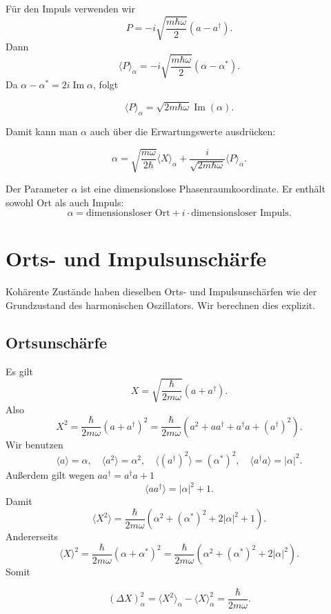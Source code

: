 Für den Impuls verwenden wir
\[
    P=-i\sqrt{\frac{m\hbar\omega}{2}}(a-a^\dagger).
\]
Dann
\[
    \langle P\rangle_\alpha
    =-i\sqrt{\frac{m\hbar\omega}{2}}(\alpha-
    \alpha^*).
\]
Da \(\alpha-
\alpha^*=2i\operatorname{Im}\alpha\), folgt
\begin{formulabox}
\[
    \langle P\rangle_\alpha
    =\sqrt{2m\hbar\omega}\operatorname{Im}(\alpha).
\]
\end{formulabox}

Damit kann man \(\alpha\) auch über die Erwartungswerte ausdrücken:
\begin{formulabox}
\[
    \alpha
    =\sqrt{\frac{m\omega}{2\hbar}}\langle X\rangle_
    \alpha
    +\frac{i}{\sqrt{2m\hbar\omega}}\langle P\rangle_
    \alpha.
\]
\end{formulabox}

\begin{conceptbox}
Der Parameter \(\alpha\) ist eine dimensionslose Phasenraumkoordinate. Er enthält sowohl Ort als auch Impuls:
\[
    \alpha = \text{dimensionsloser Ort}+i\cdot\text{dimensionsloser Impuls}.
\]
\end{conceptbox}

\section{Orts- und Impulsunschärfe}

Kohärente Zustände haben dieselben Orts- und Impulsunschärfen wie der Grundzustand des harmonischen Oszillators. Wir berechnen dies explizit.

\subsection{Ortsunschärfe}

Es gilt
\[
    X=\sqrt{\frac{\hbar}{2m\omega}}(a+a^\dagger).
\]
Also
\[
    X^2=\frac{\hbar}{2m\omega}(a+a^\dagger)^2
    =\frac{\hbar}{2m\omega}\left(a^2+aa^\dagger+a^\dagger a+(a^\dagger)^2\right).
\]
Wir benutzen
\[
    \langle a\rangle=\alpha,
    \quad
    \langle a^2\rangle=\alpha^2,
    \quad
    \langle (a^\dagger)^2\rangle=(\alpha^*)^2,
    \quad
    \langle a^\dagger a\rangle=|\alpha|^2.
\]
Außerdem gilt wegen \(aa^\dagger=a^\dagger a+1\)
\[
    \langle aa^\dagger\rangle=|\alpha|^2+1.
\]
Damit
\[
    \langle X^2\rangle
    =\frac{\hbar}{2m\omega}\left(\alpha^2+(\alpha^*)^2+2|\alpha|^2+1\right).
\]
Andererseits
\[
    \langle X\rangle^2
    =\frac{\hbar}{2m\omega}(\alpha+\alpha^*)^2
    =\frac{\hbar}{2m\omega}\left(\alpha^2+(\alpha^*)^2+2|\alpha|^2\right).
\]
Somit
\begin{formulabox}
\[
    (\Delta X)^2_\alpha
    =\langle X^2\rangle_\alpha-\langle X\rangle_\alpha^2
    =\frac{\hbar}{2m\omega}.
\]
\end{formulabox}

